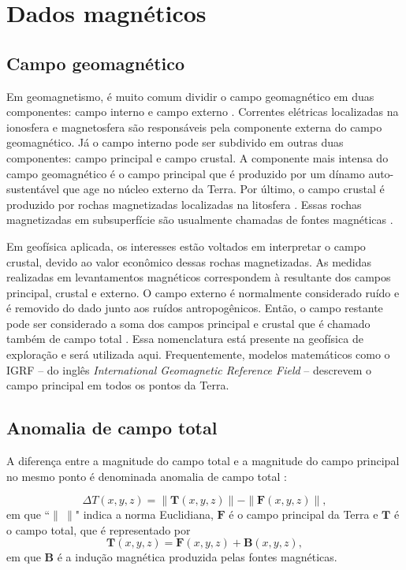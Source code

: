 \chapter{Dados magnéticos}

\section{Campo geomagnético}

Em geomagnetismo, é muito comum dividir o campo geomagnético em duas componentes: campo interno e campo externo \citep{treatise2007}. Correntes elétricas localizadas na ionosfera e magnetosfera são responsáveis pela componente externa do campo geomagnético. Já o campo interno pode ser subdivido em outras duas componentes: campo principal e campo crustal. A componente mais intensa do campo geomagnético é o campo principal que é produzido por um dínamo auto-sustentável que age no núcleo externo da Terra. Por último, o campo crustal é produzido por rochas magnetizadas localizadas na litosfera \citep{langel-hinze1998, treatise2007}. Essas rochas magnetizadas em subsuperfície são usualmente chamadas de fontes magnéticas \citep{blakely1996, nabighian-etal2005-mag}.

Em geofísica aplicada, os interesses estão voltados em interpretar o campo crustal, devido ao valor econômico dessas rochas magnetizadas. As medidas realizadas em levantamentos magnéticos correspondem à resultante dos campos principal, crustal e externo. O campo externo é normalmente considerado ruído e é removido do dado junto aos ruídos antropogênicos. Então, o campo restante pode ser considerado a soma dos campos principal e crustal \citep{treatise2007} que é chamado também de campo total \citep{blakely1996}. Essa nomenclatura está presente na geofísica de exploração e será utilizada aqui. Frequentemente, modelos matemáticos como o IGRF -- do inglês \textit{International Geomagnetic Reference Field} -- descrevem o campo principal em todos os pontos da Terra.

\section{Anomalia de campo total}

A diferença entre a magnitude do campo total e a magnitude do campo principal no mesmo ponto é denominada anomalia de campo total \citep{blakely1996, nabighian-etal2005-mag}:

\begin{equation}\label{eq:anomtotal}
\Delta T(x, y, z) = \|\mathbf{T}(x, y, z)\| - \| \mathbf{F}(x, y, z)\|,
\end{equation}
em que ``$\| \: \|$" indica a norma Euclidiana, $\mathbf{F}$ é o campo principal da Terra e $\mathbf{T}$ é o campo total, que é representado por
\begin{equation}\label{eq:camptotal}
\mathbf{T}(x, y, z) = \mathbf{F}(x, y, z) + \mathbf{B}(x, y, z) ,
\end{equation}
em que $\mathbf{B}$ é a indução magnética produzida pelas fontes magnéticas.

